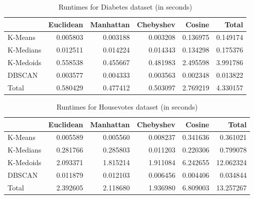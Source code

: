 \begin{table}[H]
	\begin{tabular}{lrrrr|r}
		\toprule
		{} &  Euclidean &  Manhattan &  Chebyshev &    Cosine &     Total \\
		\midrule
		K-Means   &   0.005803 &   0.003188 &   0.003208 &  0.136975 &  0.149174 \\
		K-Medians &   0.012511 &   0.014224 &   0.014343 &  0.134298 &  0.175376 \\
		K-Medoids &   0.558538 &   0.455667 &   0.481983 &  2.495598 &  3.991786 \\
		DBSCAN    &   0.003577 &   0.004333 &   0.003563 &  0.002348 &  0.013822 \\
		\midrule
		Total     &   0.580429 &   0.477412 &   0.503097 &  2.769219 &  4.330157 \\
		\bottomrule
		
	\end{tabular}
	\caption{Runtimes for Diabetes dataset (in seconds)}
\end{table}


\begin{table}[H]
	\begin{tabular}{lrrrr|r}
		\toprule
		{} &  Euclidean &  Manhattan &  Chebyshev &    Cosine &      Total \\
		\midrule
		K-Means   &   0.005589 &   0.005560 &   0.008237 &  0.341636 &   0.361021 \\
		K-Medians &   0.281766 &   0.285803 &   0.011203 &  0.220306 &   0.799078 \\
		K-Medoids &   2.093371 &   1.815214 &   1.911084 &  6.242655 &  12.062324 \\
		DBSCAN    &   0.011879 &   0.012103 &   0.006456 &  0.004406 &   0.034844 \\
		\midrule
		Total     &   2.392605 &   2.118680 &   1.936980 &  6.809003 &  13.257267 \\
		\bottomrule
	\end{tabular}
	\caption{Runtimes for Housevotes dataset (in seconds)}
\end{table}


